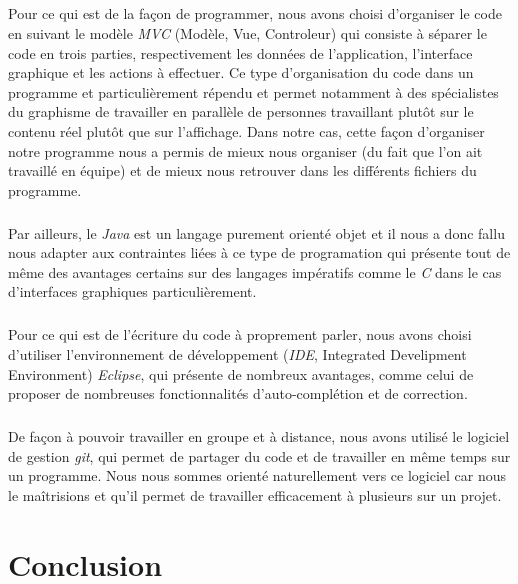 \documentclass[11pt, a4paper]{report}
\begin{document}
\paragraph{}Pour ce qui est de la façon de  programmer, nous avons choisi d'organiser le code en suivant le modèle \textit{MVC} (Modèle, Vue, Controleur) qui consiste à séparer le code en trois parties, respectivement les données de l'application, l'interface graphique et les actions à effectuer. Ce type d'organisation du code dans un programme et particulièrement répendu et permet notamment à des spécialistes du graphisme de travailler en parallèle de personnes travaillant plutôt sur le contenu réel plutôt que sur l'affichage. Dans notre cas, cette façon d'organiser notre programme nous a permis de mieux nous organiser (du fait que l'on ait travaillé en équipe) et de mieux nous retrouver dans les différents fichiers du programme.

\paragraph{}Par ailleurs, le \textit{Java} est un langage purement orienté objet et il nous a donc fallu nous adapter aux contraintes liées à ce type de programation qui présente tout de même des avantages certains sur des langages impératifs comme le \textit{C} dans le cas d'interfaces graphiques particulièrement.

\paragraph{}Pour ce qui est de l'écriture du code à proprement parler, nous avons choisi d'utiliser l'environnement de développement (\textit{IDE}, Integrated Develipment Environment) \textit{Eclipse}, qui présente de nombreux avantages, comme celui de proposer de nombreuses fonctionnalités d'auto-complétion et de correction.

\paragraph{}De façon à pouvoir travailler en groupe et à distance, nous avons utilisé le logiciel de gestion \textit{git}, qui permet de partager du code et de travailler en même temps sur un programme. Nous nous sommes orienté naturellement vers ce logiciel car nous le maîtrisions et qu'il permet de travailler efficacement à plusieurs sur un projet.



\chapter*{Conclusion}
\end{document}
